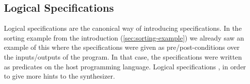 
\subsection{Logical Specifications}

Logical specifications are the canonical way of introducing specifications. In
the sorting example from the introduction (\ref{sec:sorting-example}) we already
saw an example of this where the specifications were given as
pre/post-conditions over the inputs/outputs of the program. In that case, the
specifications were written as predicates on the host programming language.
Logical specifications , in order to give more hints to the
synthesizer.






